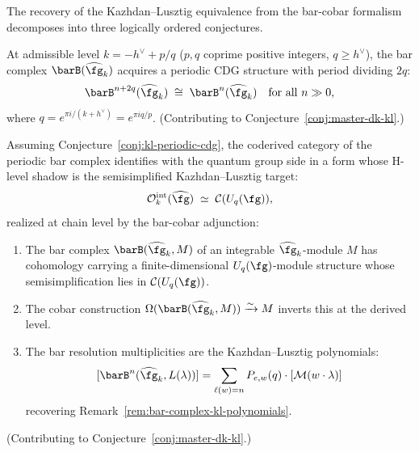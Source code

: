 \begin{remark}%
\label{rem:kl-programme}
The recovery of the Kazhdan--Lusztig equivalence from the bar-cobar
formalism decomposes into three logically ordered conjectures.
\end{remark}

\begin{conjecture}\label{conj:kl-periodic-cdg}
At admissible level $k = -h^\vee + p/q$ ($p, q$ coprime positive integers,
$q \geq h^\vee$), the bar complex $\barB(\widehat{\fg}_k)$ acquires a
periodic CDG structure with period dividing $2q$:
\[
\barB^{n+2q}(\widehat{\fg}_k) \;\cong\; \barB^n(\widehat{\fg}_k)
\quad \text{for all } n \gg 0,
\]
where $q = e^{\pi i/(k+h^\vee)} = e^{\pi i q/p}$.
(Contributing to Conjecture~\ref{conj:master-dk-kl}.)
\end{conjecture}

\begin{conjecture}\label{conj:kl-coderived}
Assuming Conjecture~\textup{\ref{conj:kl-periodic-cdg}}, the
coderived category of the periodic bar complex identifies with the
quantum group side in a form whose H-level shadow is the
semisimplified Kazhdan--Lusztig target:
\begin{equation}\label{eq:kl-bar-cobar}
\mathcal{O}_k^{\mathrm{int}}(\widehat{\fg})
\;\simeq\;
\mathcal{C}(U_q(\fg)),
\end{equation}
realized at chain level by the bar-cobar adjunction:
\begin{enumerate}[label=\textup{(\roman*)}]
\item The bar complex $\barB(\widehat{\fg}_k, M)$ of an integrable
  $\widehat{\fg}_k$-module $M$ has cohomology carrying a finite-dimensional
  $U_q(\fg)$-module structure whose semisimplification lies in
  $\mathcal{C}(U_q(\fg))$.
\item The cobar construction $\Omega(\barB(\widehat{\fg}_k, M))
  \xrightarrow{\sim} M$ inverts this at the derived level.
\item The bar resolution multiplicities are the Kazhdan--Lusztig
  polynomials:
  \begin{equation}\label{eq:bar-kl-poly}
  [\barB^n(\widehat{\fg}_k, L(\lambda))]
  = \sum_{\ell(w) = n} P_{e,w}(q) \cdot [\mathcal{M}(w \cdot \lambda)]
  \end{equation}
  recovering Remark~\textup{\ref{rem:bar-complex-kl-polynomials}}.
\end{enumerate}
(Contributing to Conjecture~\ref{conj:master-dk-kl}.)
\end{conjecture}

